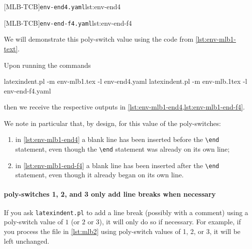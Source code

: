 		\begin{minipage}{.45\textwidth}
			{\texttt{env-end4.yaml}}{lst:env-end4}
		\end{minipage}
		\hfill
		\begin{minipage}{.5\textwidth}
			{\texttt{env-end-f4.yaml}}{lst:env-end-f4}
		\end{minipage}

		We will demonstrate this poly-switch value using the code from \vref{lst:env-mlb1-text}.

		Upon running the commands  
		\begin{commandshell}
latexindent.pl -m env-mlb1.tex -l env-end4.yaml
latexindent.pl -m env-mlb.1tex -l env-end-f4.yaml
\end{commandshell}

		then we receive the respective outputs in \cref{lst:env-mlb1-end4,lst:env-mlb1-end-f4}.

		\begin{cmhtcbraster}[raster column skip=.1\linewidth]
		\end{cmhtcbraster}

		We note in particular that, by design, for this value of the poly-switches:
		\begin{enumerate}
			\item in \cref{lst:env-mlb1-end4} a blank line has been inserted before the \lstinline!\end!
			      statement, even though the \lstinline!\end! statement was already on its own line;
			\item in \cref{lst:env-mlb1-end-f4} a blank line has been inserted after the \lstinline!\end!
			      statement, even though it already began on its own line.
		\end{enumerate}

	\paragraph{poly-switches 1, 2, and 3 only add line breaks when necessary}
		If you ask \texttt{latexindent.pl} to add a line break (possibly with a comment) using a
		poly-switch value of $1$ (or $2$ or $3$), it will only do so if necessary. For example,
		if you process the file in \vref{lst:mlb2} using poly-switch values of 1, 2, or 3, it
		will be left unchanged.

